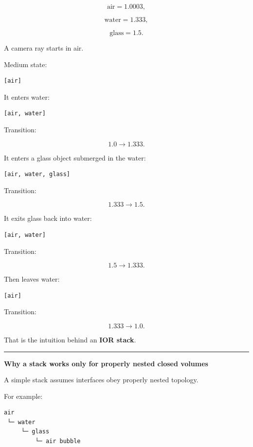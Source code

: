 \[
\text{air}=1.0003,
\]

\[
\text{water}=1.333,
\]

\[
\text{glass}=1.5.
\]

A camera ray starts in air.

Medium state:

\begin{verbatim}
[air]
\end{verbatim}

It enters water:

\begin{verbatim}
[air, water]
\end{verbatim}

Transition:

\[
1.0\rightarrow1.333.
\]

It enters a glass object submerged in the water:

\begin{verbatim}
[air, water, glass]
\end{verbatim}

Transition:

\[
1.333\rightarrow1.5.
\]

It exits glass back into water:

\begin{verbatim}
[air, water]
\end{verbatim}

Transition:

\[
1.5\rightarrow1.333.
\]

Then leaves water:

\begin{verbatim}
[air]
\end{verbatim}

Transition:

\[
1.333\rightarrow1.0.
\]

That is the intuition behind an \textbf{IOR stack}.

\begin{center}\rule{0.5\linewidth}{0.5pt}\end{center}

\textbf{Why a stack works only for properly nested closed volumes}

A simple stack assumes interfaces obey properly nested topology.

For example:

\begin{verbatim}
air
 └─ water
     └─ glass
         └─ air bubble
\end{verbatim}

